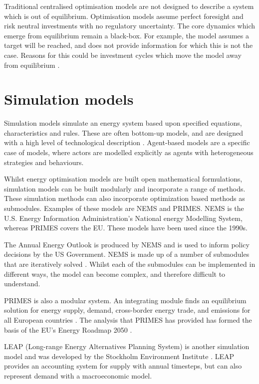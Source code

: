 Traditional centralised optimisation models are not designed to  describe a system which is out of equilibrium. Optimisation models assume perfect foresight and risk neutral investments with no regulatory uncertainty. The core dynamics which emerge from equilibrium remain a black-box. For example, the model assumes a target will be reached, and does not provide information for which this is not the case. Reasons for this could be investment cycles which move the model away from equilibrium \cite{Chappin2017}.

\section{Simulation models}
\label{sec:litreview:simulation}

Simulation models simulate an energy system based upon specified equations, characteristics and rules. These are often bottom-up models, and are designed with a high level of technological description \cite{Ringkjob2018}. Agent-based models are a specific case of models, where actors are modelled explicitly as agents with heterogeneous strategies and behaviours.

Whilst energy optimisation models are built open mathematical formulations, simulation models can be built modularly and incorporate a range of methods. These simulation methods can also incorporate optimization based methods as submodules. Examples of these models are NEMS and PRIMES. NEMS is the U.S. Energy Information Administration's National energy Modelling System, whereas PRIMES covers the EU. These models have been used since the 1990s.

The Annual Energy Outlook is produced by NEMS and is used to inform policy decisions by the US Government. NEMS is made up of a number of submodules that are iteratively solved \cite{Gabriel2001}. Whilst each of the submodules can be implemented in different ways, the model can become complex, and therefore difficult to understand. 

PRIMES is also a modular system. An integrating module finds an equilibrium solution for energy supply, demand, cross-border energy trade, and emissions for all European countries \cite{Capros2012}. The analysis that PRIMES has provided has formed the basis of the EU's Energy Roadmap 2050 \cite{Gupta2011}.

LEAP (Long-range Energy Alternatives Planning System) is another simulation model and was developed by the Stockholm Environment Institute \cite{LEAP2012a}. LEAP provides an accounting system for supply with annual timesteps, but can also represent demand with a macroeconomic model. 


